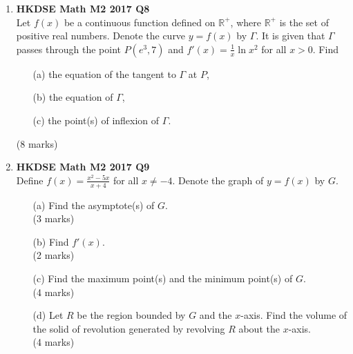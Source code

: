 \documentclass{report}
\begin{document}
\begin{enumerate}
	\item \textbf{HKDSE Math M2 2017 Q8}\\
	Let $f(x) $ be a continuous function defined on  $\mathbb{R} ^+$, where $\mathbb{R} ^+$ is the set of positive real numbers. Denote the curve $y = f(x)$ by  $\Gamma$. It is given that $\Gamma$ passes through the point $P(e^3 , 7)$ and $f'(x) = \displaystyle\frac{1}{x} \ln{x^2}$ for all $x>0$. Find 
	\begin{enumerate}
		\item [(a)] the equation of the tangent to $\Gamma$ at $P$,
		\item [(b)] the equation of $\Gamma$,
		\item [(c)] the point(s) of inflexion of $\Gamma$.
	\end{enumerate}
	(8 marks)

	\item \textbf{HKDSE Math M2 2017 Q9}\\
	Define $f(x) = \displaystyle\frac{x^2 - 5x}{x + 4}$ for all $x \neq -4$. Denote the graph of $y = f(x)$ by $G$. 
	\begin{enumerate}
		\item [(a)]Find the asymptote(s) of $G$.  \\(3 marks)
		\item [(b)]Find $f'(x)$. \\(2 marks) 
		\item [(c)]Find the maximum point(s) and the minimum point(s) of $G$. \\(4 marks) 
		\item [(d)]Let $R$ be the region bounded by $G$ and the $x$-axis. Find the volume of the solid of revolution generated by revolving $R$ about the $x$-axis. \\(4 marks)
	\end{enumerate}

	\newpage


\end{enumerate}
\end{document}
